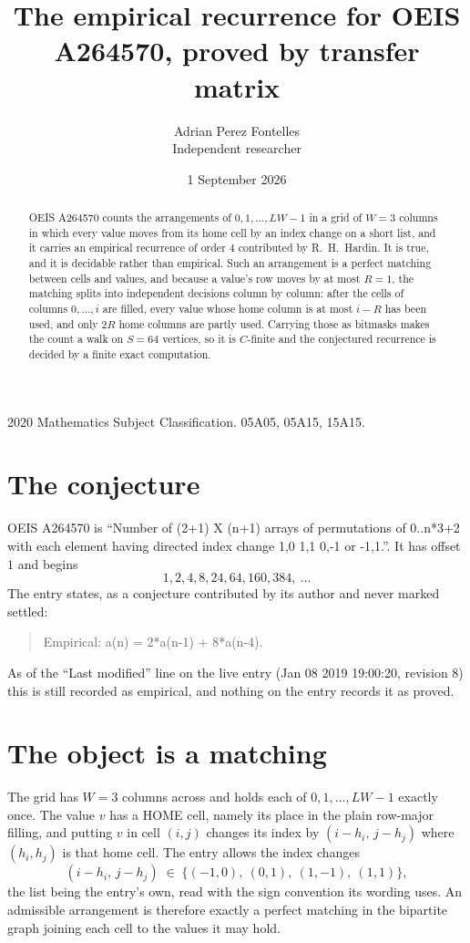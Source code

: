 \documentclass[11pt,a4paper]{article}
\title{The empirical recurrence for OEIS A264570, proved by transfer matrix}
\author{Adrian Perez Fontelles\\ \small Independent researcher}
\date{1 September 2026}
\theoremstyle{plain}
\theoremstyle{definition}
\begin{document}
\maketitle

\begin{abstract}
OEIS A264570 counts the arrangements of $0,1,\dots,LW-1$ in a grid of $W=3$ columns in which
every value moves from its home cell by an index change on a short list, and it carries an
empirical recurrence of order $4$ contributed by R.~H.~Hardin. It is true, and it is
decidable rather than empirical. Such an arrangement is a perfect matching between cells and
values, and because a value's row moves by at most $R=1$, the matching splits into
independent decisions column by column: after the cells of columns $0,\dots,i$ are filled,
every value whose home column is at most $i-R$ has been used, and only $2R$ home columns are
partly used. Carrying those as bitmasks makes the count a walk on $S=64$ vertices, so it is
$C$-finite and the conjectured recurrence is decided by a finite exact computation.
\end{abstract}

\noindent\small 2020 Mathematics Subject Classification. 05A05, 05A15, 15A15.\normalsize

\section{The conjecture}

OEIS A264570 is ``Number of (2+1) X (n+1) arrays of permutations of 0..n*3+2 with each element having directed index change 1,0 1,1 0,-1 or -1,1.''. It has offset $1$ and begins
\[
1, 2, 4, 8, 24, 64, 160, 384,\ \dots
\]
The entry states, as a conjecture contributed by its author and never marked settled:
\begin{quote}
Empirical: a(n) = 2*a(n-1) + 8*a(n-4).
\end{quote}
As of the ``Last modified'' line on the live entry (Jan 08 2019 19:00:20, revision 8) this is still
recorded as empirical, and nothing on the entry records it as proved.

\section{The object is a matching}

The grid has $W=3$ columns across and holds each of $0,1,\dots,LW-1$ exactly once. The value
$v$ has a HOME cell, namely its place in the plain row-major filling, and putting $v$ in cell
$(i,j)$ changes its index by $(i-h_i,\,j-h_j)$ where $(h_i,h_j)$ is that home cell. The entry
allows the index changes
\[
(i-h_i,\,j-h_j)\;\in\;\{(-1,0),\ (0,1),\ (1,-1),\ (1,1)\},
\]
the list being the entry's own, read with the sign convention its wording uses. An admissible
arrangement is therefore exactly a perfect matching in the bipartite graph joining each cell to
the values it may hold.
\end{document}
